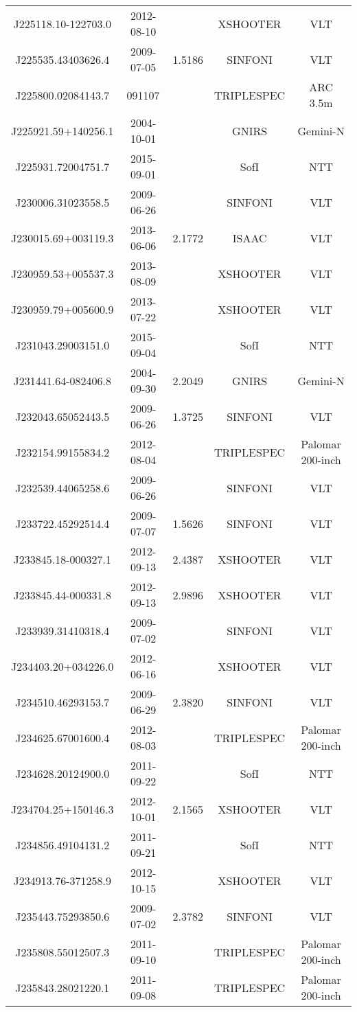 {\begin{longtable}{ccccc}
J225118.10-122703.0 & 2012-08-10 &  & XSHOOTER & VLT \\
J225535.43403626.4 & 2009-07-05 & 1.5186 & SINFONI & VLT \\
J225800.02084143.7 & 091107 &  & TRIPLESPEC & ARC 3.5m \\
J225921.59+140256.1 & 2004-10-01 &  & GNIRS & Gemini-N \\
J225931.72004751.7 & 2015-09-01 &  & SofI & NTT \\
J230006.31023558.5 & 2009-06-26 &  & SINFONI & VLT \\
J230015.69+003119.3 & 2013-06-06 & 2.1772 & ISAAC & VLT \\
J230959.53+005537.3 & 2013-08-09 &  & XSHOOTER & VLT \\
J230959.79+005600.9 & 2013-07-22 &  & XSHOOTER & VLT \\
J231043.29003151.0 & 2015-09-04 &  & SofI & NTT \\
J231441.64-082406.8 & 2004-09-30 & 2.2049 & GNIRS & Gemini-N \\
J232043.65052443.5 & 2009-06-26 & 1.3725 & SINFONI & VLT \\
J232154.99155834.2 & 2012-08-04 &  & TRIPLESPEC & Palomar 200-inch \\
J232539.44065258.6 & 2009-06-26 &  & SINFONI & VLT \\
J233722.45292514.4 & 2009-07-07 & 1.5626 & SINFONI & VLT \\
J233845.18-000327.1 & 2012-09-13 & 2.4387 & XSHOOTER & VLT \\
J233845.44-000331.8 & 2012-09-13 & 2.9896 & XSHOOTER & VLT \\
J233939.31410318.4 & 2009-07-02 &  & SINFONI & VLT \\
J234403.20+034226.0 & 2012-06-16 &  & XSHOOTER & VLT \\
J234510.46293153.7 & 2009-06-29 & 2.3820 & SINFONI & VLT \\
J234625.67001600.4 & 2012-08-03 &  & TRIPLESPEC & Palomar 200-inch \\
J234628.20124900.0 & 2011-09-22 &  & SofI & NTT \\
J234704.25+150146.3 & 2012-10-01 & 2.1565 & XSHOOTER & VLT \\
J234856.49104131.2 & 2011-09-21 &  & SofI & NTT \\
J234913.76-371258.9 & 2012-10-15 &  & XSHOOTER & VLT \\
J235443.75293850.6 & 2009-07-02 & 2.3782 & SINFONI & VLT \\
J235808.55012507.3 & 2011-09-10 &  & TRIPLESPEC & Palomar 200-inch \\
J235843.28021220.1 & 2011-09-08 &  & TRIPLESPEC & Palomar 200-inch \\
\end{longtable}}


